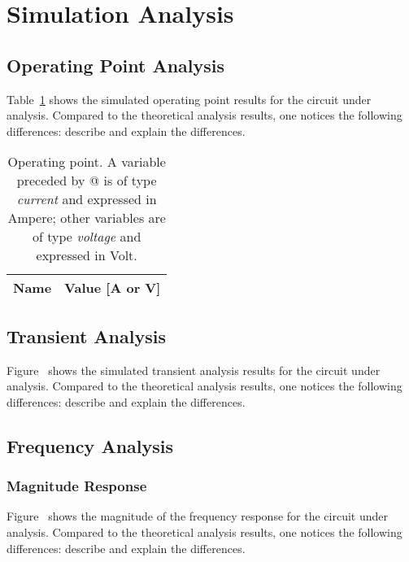 \section{Simulation Analysis}
\label{sec:simulation}

\subsection{Operating Point Analysis}

Table~\ref{tab:op} shows the simulated operating point results for the circuit under analysis. Compared to the theoretical analysis results, one notices the following differences: describe and explain the differences.

\begin{table}[H]
  \centering
  \begin{tabular}{|l|r|}
    \hline    
    {\bf Name} & {\bf Value [A or V]} \\ \hline
    
  \end{tabular}
  \caption{Operating point. A variable preceded by @ is of type {\em current} and expressed in Ampere; other variables are of type {\it voltage} and expressed in Volt.}
  \label{tab:op}
\end{table}


\subsection{Transient Analysis}

Figure~ %
shows the simulated transient analysis results for the circuit under analysis. Compared to the theoretical analysis results, one notices the following differences: describe and explain the differences.



\subsection{Frequency Analysis}

\subsubsection{Magnitude Response}

Figure~%
shows the magnitude of the frequency response for the circuit under analysis. Compared to the theoretical analysis results, one notices the following differences: describe and explain the differences.

